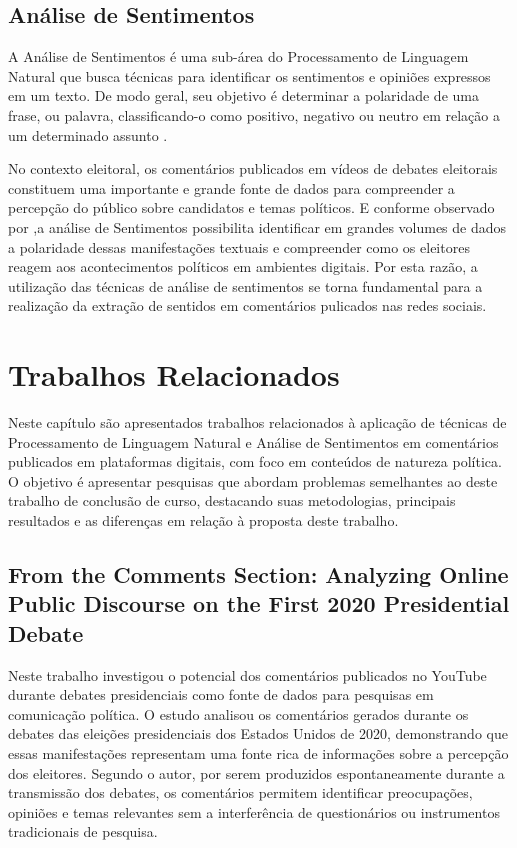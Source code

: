 \documentclass[
	12pt,				%
	openright,			%
	oneside,			%
	a4paper,			%
	english,			%
	brazil				%
	]{abntex2}
\begin{document}
\section{Análise de Sentimentos}
A Análise de Sentimentos é uma sub-área do Processamento de Linguagem Natural que busca técnicas para identificar os sentimentos e opiniões expressos em um texto. De modo geral, seu objetivo é determinar a polaridade de uma frase, ou palavra, classificando-o como positivo, negativo ou neutro em relação a um determinado assunto \cite{BPLN_livro_4ed_2026}.

No contexto eleitoral, os comentários publicados em vídeos de debates eleitorais constituem uma importante e grande fonte de dados para compreender a percepção do público sobre candidatos e temas políticos. E conforme observado por \cite{info15110705},a análise de Sentimentos possibilita identificar em grandes volumes de dados a polaridade dessas manifestações textuais e compreender como os eleitores reagem aos acontecimentos políticos em ambientes digitais. Por esta razão, a utilização das técnicas de análise de sentimentos se torna fundamental para a realização da extração de sentidos em comentários pulicados nas redes sociais. 
\chapter{Trabalhos Relacionados} \label{cap:trabRel}
 Neste capítulo são apresentados trabalhos relacionados à aplicação de técnicas de Processamento de Linguagem Natural e Análise de Sentimentos em comentários publicados em plataformas digitais, com foco em conteúdos de natureza política. O objetivo é apresentar pesquisas que abordam problemas semelhantes ao deste trabalho de conclusão de curso, destacando suas metodologias, principais resultados e as diferenças em relação à proposta deste trabalho.
\section{From the Comments Section: Analyzing Online Public Discourse on the First 2020 Presidential Debate}

Neste trabalho \cite{Eaton2024} investigou o potencial dos comentários publicados no YouTube durante debates presidenciais como fonte de dados para pesquisas em comunicação política. O estudo analisou os comentários gerados durante os debates das eleições presidenciais dos Estados Unidos de 2020, demonstrando que essas manifestações representam uma fonte rica de informações sobre a percepção dos eleitores. Segundo o autor, por serem produzidos espontaneamente durante a transmissão dos debates, os comentários permitem identificar preocupações, opiniões e temas relevantes sem a interferência de questionários ou instrumentos tradicionais de pesquisa.
\end{document}
